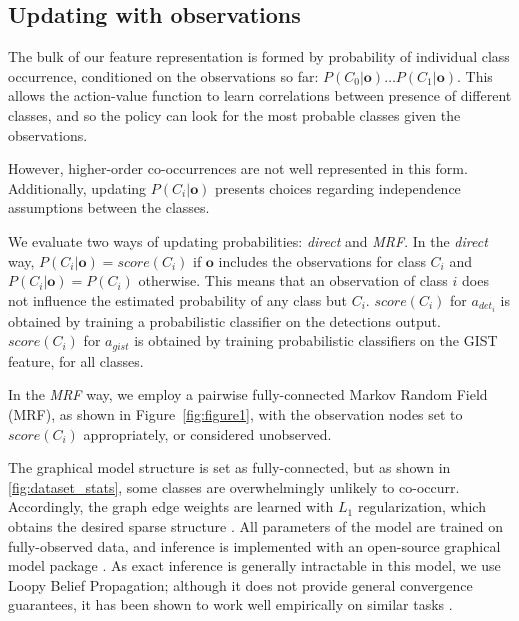 \subsection{Updating with observations} \label{sec:updating}

The bulk of our feature representation is formed by probability of individual class occurrence, conditioned on the observations so far: $P(C_0|\mathbf{o}) \ldots P(C_1|\mathbf{o})$.
This allows the action-value function to learn correlations between presence of different classes, and so the policy can look for the most probable classes given the observations.

However, higher-order co-occurrences are not well represented in this form.
Additionally, updating $P(C_i|\mathbf{o})$ presents choices regarding independence assumptions between the classes.

We evaluate two ways of updating probabilities: \emph{direct} and \emph{MRF}.
In the \emph{direct} way, $P(C_i|\mathbf{o}) = score(C_i)$ if $\mathbf{o}$ includes the observations for class $C_i$ and $P(C_i|\mathbf{o}) = P(C_i)$ otherwise.
This means that an observation of class $i$ does not influence the estimated probability of any class but $C_i$.
$score(C_i)$ for $a_{{det}_i}$ is obtained by training a probabilistic classifier on the detections output.
$score(C_i)$ for $a_{gist}$ is obtained by training probabilistic classifiers on the GIST feature, for all classes.

In the \emph{MRF} way, we employ a pairwise fully-connected Markov Random Field (MRF), as shown in Figure~\ref{fig:figure1}, with the observation nodes set to $score(C_i)$ appropriately, or considered unobserved.

The graphical model structure is set as fully-connected, but as shown in \autoref{fig:dataset_stats}, some classes are overwhelmingly unlikely to co-occurr.
Accordingly, the graph edge weights are learned with $L_1$ regularization, which obtains the desired sparse structure \cite{Lee2006}.
All parameters of the model are trained on fully-observed data, and inference is implemented with an open-source graphical model package \cite{Jaimovich2010}.
As exact inference is generally intractable in this model, we use Loopy Belief Propagation; although it does not provide general convergence guarantees, it has been shown to work well empirically on similar tasks \cite{Desai2009}.
